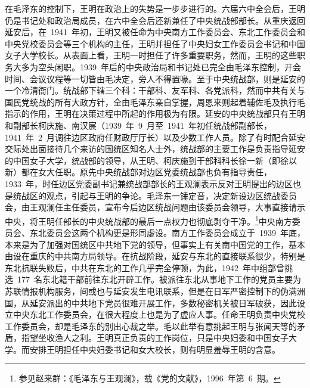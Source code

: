在毛泽东的控制下，王明在政治上的失势是一步步进行的。六届六中全会后，王明仍是书记处和政治局成员，在六中全会后还新兼任了中央统战部部长。从重庆返回延安后，在~1941~年初，王明又被任命为中央南方工作委员会、东北工作委员会和中央党校委员会等三个机构的主任，王明并担任了中央妇女工作委员会书记和中国女子大学校长。从表面上看，王明一时担任了许多重要职务，然而，王明的这些职务大多为空头闲职。1939~年后的中央政治局和书记处已完全由毛泽东控制，开会时间、会议议程等一切皆由毛决定，旁人不得置喙。至于中央统战部，则是延安的一个冷清衙门。统战部下辖三个科：干部科、友军科、各党派科，然而中共有关与国民党统战的所有大政方针，全由毛泽东亲自掌握，周恩来则起着辅佐毛及执行毛指示的作用，王明在决策过程中所起的作用极为有限。延安的中央统战部只有王明和副部长柯庆施、南汉宸（1939~年~9~月至~1941~年初任统战部副部长，1941~年~2~月调往边区政府任财政厅厅长）以及少数工作人员。除了有时配合延安交际处出面接待几个来访的国统区知名人士外，统战部的主要工作是负责指导延安的中国女子大学，统战部的领导，从王明、柯庆施到干部科科长徐一新（即徐以新）都在女大任职。原先中央统战部对边区党委统战部也负有指导责任，1933~年，时任边区党委副书记兼统战部部长的王观澜表示反对王明提出的边区也是统战区的观点，引起与王明的争论。毛泽东一锤定音，决定新设边区统战委员会，由王观澜任主任委员，宣布今后边区统战问题由该委员会领导，大事直接请示中央，将王明任部长的中央统战部的最后一点权力也彻底剥夺干净。\footnote{参见赵来群：《毛泽东与王观澜》，载《党的文献》，1996~年第~6~期。}中央南方委员会、东北委员会这两个机构更是形同虚设。南方工作委员会成立于~1939~年底，本来是为了加强对国统区中共地下党的领导，但事实上有关南中国党的工作，基本由设在重庆的中共南方局领导。在抗战阶段，延安与东北的直接联系很少，特别是东北抗联失败后，中共在东北的工作几乎完全停顿，为此，1942~年中组部曾挑选~177~名东北籍干部前往东北开辟工作。被派往东北从事地下工作的党员主要为苏联情报机构服务，间或也与延安发生电讯联系，但是在日军严密控制下的伪满洲国，从延安派出的中共地下党员很难开展工作，多数秘密机关被日军破获，因此设立中央东北工作委员会，在很大程度上也是为了虚应人事。任命王明负责中央党校工作委员会，却是毛泽东的别出心裁之举。毛以此举有意挑起王明与张闻天等的矛盾，指望坐收渔人之利。王明真正负责的工作岗位，只是中央妇委和中国女子大学。而安排王明担任中央妇委书记和女大校长，则有明显羞辱王明的含意。


